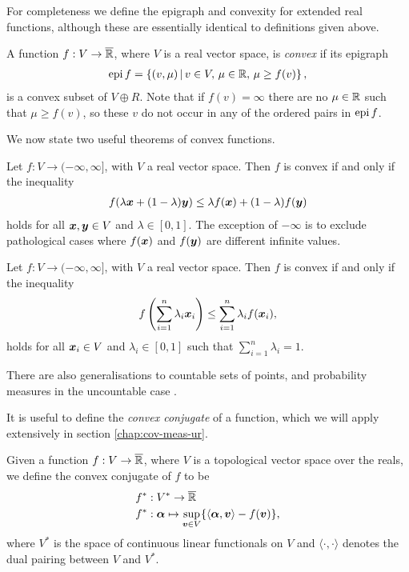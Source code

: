 For completeness we define the epigraph and convexity for extended real functions, although these are essentially identical to definitions given above.
\begin{defn}\label{defn:extended-convex-function}
  A function $f:V\to\overline{\mathbb{R}}$, where $V$ is a real vector space, is \emph{convex} if its epigraph
  \begin{align}
    \operatorname{epi} f = \left\{(v,\mu)\,\middle|\,v\in V,\,\mu\in \mathbb{R},\,\mu\geq f(v)\right\},
  \end{align}
  is a convex subset of $V\oplus R$. Note that if $f(v) =\infty$ there are no $\mu\in\mathbb{R}$ such that $\mu\geq f(v)$, so these $v$ do not occur in any of the ordered pairs in $\operatorname{epi} f$.
\end{defn}
We now state two useful theorems of convex functions.
\begin{thm}\label{thm:jensen-two-point}
  Let $f:V\to (-\infty, \infty]$, with $V$ a real vector space. Then $f$ is convex if and only if the inequality
  \begin{align}
    f(\lambda \bm{x} + (1-\lambda)\bm{y}) \leq \lambda f(\bm{x}) + (1-\lambda)f(\bm{y})
  \end{align}
  holds for all $\bm{x},\bm{y}\in V$ and $\lambda\in [0,1]$. The exception of $-\infty$ is to exclude pathological cases where $f(\bm{x})$ and $f(\bm{y})$ are different infinite values.
\end{thm}
\begin{thm}\label{thm:jensen-n-point}
  Let $f:V\to (-\infty, \infty]$, with $V$ a real vector space. Then $f$ is convex if and only if the inequality
  \begin{align}
    f\left( \sum_{i=1}^n \lambda_i \bm{x}_i \right) \leq \sum_{i=1}^n\lambda_i f(\bm{x}_i),
  \end{align}
  holds for all $\bm{x}_i\in V$ and $\lambda_i\in [0,1]$ such that $\sum_{i=1}^{n}\lambda_i = 1$.
\end{thm}
There are also generalisations to countable sets of points, and probability measures in the uncountable case \cite{Cover:2006:EIT:1146355}\cite{PERLMAN197452}.

It is useful to define the \emph{convex conjugate} of a function, which we will apply extensively in section \ref{chap:cov-meas-ur}.

\begin{defn}\label{defn:convex conjugate}
  Given a function $f:V\to\overline{\mathbb{R}}$, where $V$ is a topological vector space over the reals, we define the convex conjugate of $f$ to be
  \begin{align}
    f^*&:V^*\to \overline{\mathbb{R}}\\
    f^*&:\bm{\alpha}\mapsto\sup_{\bm{v}\in V} \{\langle\bm{\alpha},\bm{v}\rangle - f(\bm{v})\},
  \end{align}
  where $V^*$ is the space of continuous linear functionals on $V$ and $\langle\cdot,\cdot\rangle$ denotes the dual pairing between $V$ and $V^*$. 
\end{defn}


